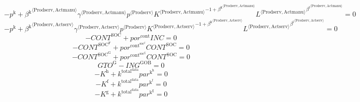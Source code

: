 \begin{equation}
-p^{\mathrm{k}} + {{\beta^{\mathrm{k}}}^{\langle \mathrm{\mathrm{Prodserv}},\mathrm{\mathrm{Actmanu}}\rangle}} {{\gamma}^{\langle \mathrm{\mathrm{Prodserv}},\mathrm{\mathrm{Actmanu}}\rangle}} {{p}^{\langle \mathrm{Prodserv}\rangle}} {{{K}^{\langle \mathrm{Prodserv},\mathrm{Actmanu}\rangle}}^{-1 + {\beta^{\mathrm{k}}}^{\langle \mathrm{\mathrm{Prodserv}},\mathrm{\mathrm{Actmanu}}\rangle}}} {{{L}^{\langle \mathrm{Prodserv},\mathrm{Actmanu}\rangle}}^{{\beta^{\mathrm{l}}}^{\langle \mathrm{\mathrm{Prodserv}},\mathrm{\mathrm{Actmanu}}\rangle}}} = 0
\end{equation}
\begin{equation}
-p^{\mathrm{k}} + {{\beta^{\mathrm{k}}}^{\langle \mathrm{\mathrm{Prodserv}},\mathrm{\mathrm{Actserv}}\rangle}} {{\gamma}^{\langle \mathrm{\mathrm{Prodserv}},\mathrm{\mathrm{Actserv}}\rangle}} {{p}^{\langle \mathrm{Prodserv}\rangle}} {{{K}^{\langle \mathrm{Prodserv},\mathrm{Actserv}\rangle}}^{-1 + {\beta^{\mathrm{k}}}^{\langle \mathrm{\mathrm{Prodserv}},\mathrm{\mathrm{Actserv}}\rangle}}} {{{L}^{\langle \mathrm{Prodserv},\mathrm{Actserv}\rangle}}^{{\beta^{\mathrm{l}}}^{\langle \mathrm{\mathrm{Prodserv}},\mathrm{\mathrm{Actserv}}\rangle}}} = 0
\end{equation}
\begin{equation}
-{C\!O\!N\!T}^{\mathrm{SOC}} + {{p\!o\!r}^{\mathrm{cont}}} {{I\!N\!C}} = 0
\end{equation}
\begin{equation}
-{C\!O\!N\!T}^{\mathrm{SOC}^{\mathrm{F}}} + {{p\!o\!r}^{\mathrm{cont}^{\mathrm{soc}^{\mathrm{f}}}}} {{C\!O\!N\!T}^{\mathrm{SOC}}} = 0
\end{equation}
\begin{equation}
-{C\!O\!N\!T}^{\mathrm{SOC}^{\mathrm{G}}} + {{p\!o\!r}^{\mathrm{cont}^{\mathrm{soc}^{\mathrm{g}}}}} {{C\!O\!N\!T}^{\mathrm{SOC}}} = 0
\end{equation}
\begin{equation}
{G\!T\!O}^{\mathrm{G}} - {I\!N\!G}^{\mathrm{GOB}} = 0
\end{equation}
\begin{equation}
-K^{\mathrm{h}} + {k^{\mathrm{total}^{\mathrm{data}}}} {{p\!a\!r}^{\mathrm{k}^{\mathrm{h}}}} = 0
\end{equation}
\begin{equation}
-K^{\mathrm{f}} + {k^{\mathrm{total}^{\mathrm{data}}}} {{p\!a\!r}^{\mathrm{k}^{\mathrm{f}}}} = 0
\end{equation}
\begin{equation}
-K^{\mathrm{g}} + {k^{\mathrm{total}^{\mathrm{data}}}} {{p\!a\!r}^{\mathrm{k}^{\mathrm{g}}}} = 0
\end{equation}
